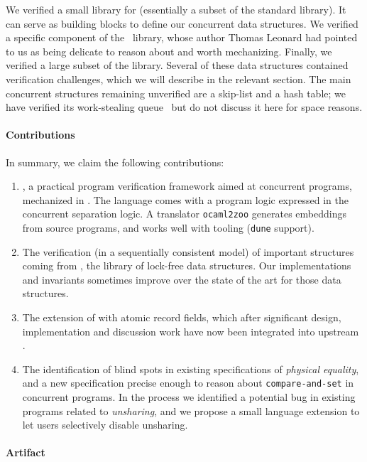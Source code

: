 We verified a small library for \ZooLang (essentially a subset of the \OCaml standard library).
It can serve as building blocks to define our concurrent data structures.
We verified a specific component of the \Eio~library, whose author Thomas Leonard had pointed to us as being delicate to reason about and worth mechanizing.
Finally, we verified a large subset of the \Saturn library.
Several of these data structures contained verification challenges, which we will describe in the relevant section.
The main \Saturn concurrent structures remaining unverified are a skip-list and a hash table; we have verified its work-stealing queue~\citep*{DBLP:conf/spaa/ChaseL05} but do not discuss it here for space reasons.

\paragraph{Contributions}

In summary, we claim the following contributions:
\begin{enumerate}
  \item
    \Zoo, a practical program verification framework aimed at concurrent \OCaml programs, mechanized in \Rocq.
    The language \ZooLang comes with a program logic expressed in the \Iris concurrent separation logic.
    A translator \texttt{ocaml2zoo} generates \Rocq embeddings from source \OCaml programs, and works well with \OCaml tooling (\texttt{dune} support).
  \item
    The verification (in a sequentially consistent model) of important structures coming from \Saturn, the \OCamlFive library of lock-free data structures.
    Our implementations and invariants sometimes improve over the \Iris state of the art for those data structures.
  \item
    The extension of \OCaml with atomic record fields, which after significant design, implementation and discussion work have now been integrated into upstream \OCaml.
  \item
    The identification of blind spots in existing specifications of \emph{physical equality}, and a new specification precise enough to reason about \texttt{compare-and-set} in concurrent programs.
    In the process we identified a potential bug in existing \OCaml programs related to \emph{unsharing}, and we propose a small language extension to let users selectively disable unsharing.
\end{enumerate}

\paragraph{Artifact}

